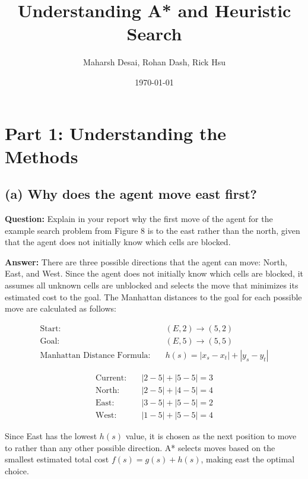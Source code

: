 \documentclass{article}
\begin{document}
\title{Understanding A* and Heuristic Search}
\author{Maharsh Desai, Rohan Dash, Rick Hsu}
\date{\today}
\maketitle

\section{Part 1: Understanding the Methods}

\subsection{(a) Why does the agent move east first?}

\textbf{Question:} Explain in your report why the first move of the agent for the example search problem from Figure 8 is to the east rather than the north, given that the agent does not initially know which cells are blocked.


\textbf{Answer:}  
There are three possible directions that the agent can move: North, East, and West. Since the agent does not initially know which cells are blocked, it assumes all unknown cells are unblocked and selects the move that minimizes its estimated cost to the goal. The Manhattan distances to the goal for each possible move are calculated as follows:

\begin{align*}
\text{Start:} & \quad (E,2) \rightarrow (5,2) \\
\text{Goal:} & \quad (E,5) \rightarrow (5,5) \\
\text{Manhattan Distance Formula:} & \quad h(s) = |x_s - x_t| + |y_s - y_t|
\end{align*}

\begin{align*}
\text{Current:} & \quad |2 - 5| + |5 - 5| = 3 \\
\text{North:} & \quad |2 - 5| + |4 - 5| = 4 \\
\text{East:} & \quad |3 - 5| + |5 - 5| = 2 \\
\text{West:} & \quad |1 - 5| + |5 - 5| = 4
\end{align*}

Since East has the lowest \( h(s) \) value, it is chosen as the next position to move to rather than any other possible direction. A* selects moves based on the smallest estimated total cost \( f(s) = g(s) + h(s) \), making east the optimal choice.
\end{document}
